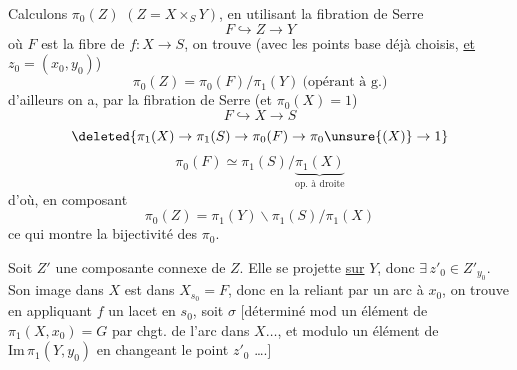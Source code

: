 Calculons $\pi_0(Z)$ $(Z=X\times_S Y)$, en utilisant la fibration de Serre
\[
 F\hookrightarrow Z\longrightarrow Y
\]
où $F$ est la fibre de $f:X\to S$, on trouve  (avec les points base déjà choisis, \uline{et} $z_0=(x_0,y_0)$)
\[
 \pi_0(Z)=\pi_0(F)/\pi_1(Y)\ \text{(opérant à g.)}
\]
d'ailleurs on a, par la fibration de Serre (et $\pi_0(X)=1$)
\[
 F\hookrightarrow X\longrightarrow S
\]
\[
 \deleted{\pi_1(X)\to\pi_1(S)\to\pi_0(F)\to\pi_0\unsure{(X)}\to1}
\]
\[
 \pi_0(F)\simeq\pi_1(S)/\underbrace{\pi_1(X)}_{\text{op. à droite}}
\]
d'où, en composant
\[
 \pi_0(Z)=\pi_1(Y)\backslash\pi_1(S)/\pi_1(X)
\]
ce qui montre la bijectivité des $\pi_0$.

 Soit $Z'$ une composante connexe de $Z$. Elle se projette \uline{sur} $Y$, donc $\exists\,z'_0\in Z'_{y_0}$. Son image dans $X$ est  dans $X_{s_0}=F$, donc
en la reliant par un arc à $x_0$, on trouve en appliquant $f$ un lacet en $s_0$, soit $\sigma$ [déterminé mod un élément de  $\pi_1(X,x_0)=G$ par chgt. de l'arc dans $X\ldots$, et modulo un élément de $\mathrm{Im}\,\pi_1(Y,y_0)$ en changeant le point $z'_0$ \ldots.]
